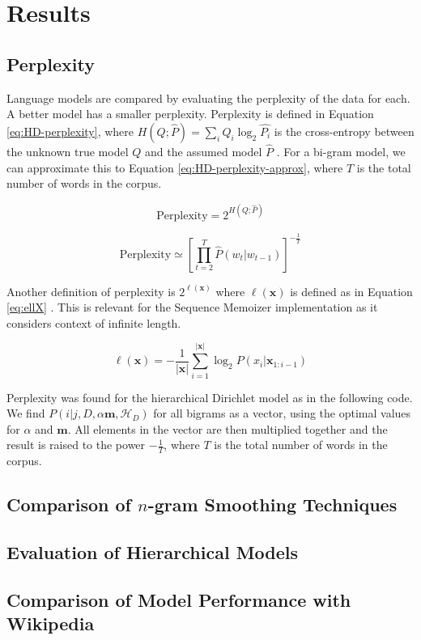 \chapter{Results}\label{chap:results}

\section{Perplexity}\label{sec:perplexity}

Language models are compared by evaluating the perplexity of the data for each. A better model has a smaller perplexity. Perplexity is defined in Equation \ref{eq:HD-perplexity}, where $H(Q;\hat{P})=\sum_{i}Q_{i}\log_{2}\hat{P_{i}}$ is the cross-entropy between the unknown true model $Q$ and the assumed model $\hat{P}$ \cite{mackay1995hierarchical}. For a bi-gram model, we can approximate this to Equation \ref{eq:HD-perplexity-approx}, where $T$ is the total number of words in the corpus.

\begin{equation}
\text{Perplexity}=2^{H(Q;\hat{P})}
\label{eq:HD-perplexity}
\end{equation}

\begin{equation}
\text{Perplexity}\simeq\left[\prod_{t=2}^{T}\hat{P}(w_{t}|w_{t-1})\right]^{-\frac{1}{T}}
\label{eq:HD-perplexity-approx}
\end{equation}

Another definition of perplexity is $2^{\ell(\boldsymbol{x})}$ where $\ell(\boldsymbol{x})$ is defined as in Equation \ref{eq:ellX} \cite{wood2011sequence}. This is relevant for the Sequence Memoizer implementation as it considers context of infinite length.

\begin{equation}
\ell(\boldsymbol{x})=-\frac{1}{|\boldsymbol{x}|}\sum_{i=1}^{|\boldsymbol{x}|}\log_{2}P(x_{i}|\boldsymbol{x}_{1:i-1})
\label{eq:ellX}
\end{equation}

Perplexity was found for the hierarchical Dirichlet model as in the following code. We find $P(i|j,D,\alpha\boldsymbol{m},\mathscr{H}_{D})$ for all bigrams as a vector, using the optimal values for $\alpha$ and $\boldsymbol{m}$. All elements in the vector are then multiplied together and the result is raised to the power $-\frac{1}{T}$, where $T$ is the total number of words in the corpus.



\section{Comparison of $n$-gram Smoothing Techniques}


\section{Evaluation of Hierarchical Models}


\section{Comparison of Model Performance with Wikipedia}

